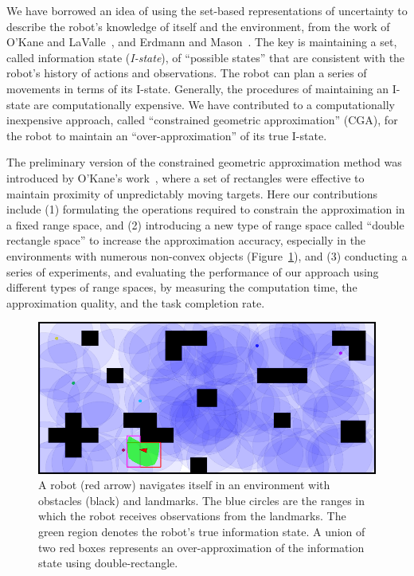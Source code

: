 We have borrowed an idea of using the set-based representations of uncertainty to describe the robot's knowledge of
itself and the environment, from the work of O'Kane and LaValle~\cite{OKaLav08,Lav06}, and Erdmann and Mason~\cite{ErdMas88}. 
The key is maintaining a set, called information state (\textit{I-state}), of ``possible states'' that are consistent with the robot's
history of actions and observations. 
The robot can plan a series of movements in terms of its I-state. 
Generally, the procedures of maintaining an I-state are
computationally expensive. 
We have contributed to a computationally
inexpensive approach, called ``constrained geometric
approximation'' (CGA), for the robot to maintain an ``over-approximation'' of its true
I-state.

The preliminary version of the constrained geometric approximation method was
introduced by O'Kane's work~\cite{OKa11}, where a set of rectangles
were effective to maintain proximity of unpredictably moving targets. 
Here our 
contributions include (1) formulating the operations required to constrain the
approximation in a fixed range space, and (2) introducing a new type of range
space called ``double rectangle space'' to increase the approximation accuracy, especially in the environments with numerous non-convex objects (Figure~\ref{fig:nav-clutter}), 
and (3) conducting a series of experiments, and evaluating the performance of
our approach using different types of range spaces, by measuring the computation time,
the approximation quality, and the task completion rate.

\begin{figure}
  \centering
  \includegraphics[width=.9\columnwidth]{figs/dbrect_clutter.png}
  \caption{A robot (red arrow) navigates itself in an environment with obstacles (black) and landmarks.
    The blue circles are the ranges in which the robot receives observations from the landmarks.
    The green region denotes the robot's true information state. 
    A union of two red boxes represents an over-approximation
    of the information state using double-rectangle.}
  \label{fig:nav-clutter}
\end{figure}

